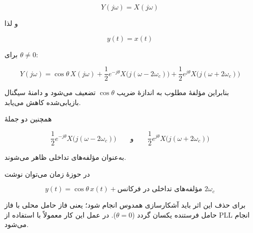 \[
Y(j\omega)=X(j\omega)
\]

و لذا

\[
{y(t)=x(t)}
\]


برای \(\theta\neq 0\):

\[
Y(j\omega)
=
\cos\theta\,X(j\omega)
+
\frac12 e^{-j\theta}
X\!\big(j(\omega-2\omega_c)\big)
+
\frac12 e^{j\theta}
X\!\big(j(\omega+2\omega_c)\big)
\]

بنابراین مؤلفهٔ مطلوب به اندازهٔ ضریب \(\cos\theta\) تضعیف می‌شود و دامنهٔ سیگنال بازیابی‌شده کاهش می‌یابد.

همچنین دو جملهٔ

\[
\frac12 e^{-j\theta}
X\!\big(j(\omega-2\omega_c)\big)
\qquad \text{و} \qquad
\frac12 e^{j\theta}
X\!\big(j(\omega+2\omega_c)\big)
\]

به‌عنوان مؤلفه‌های تداخلی ظاهر می‌شوند.

در حوزهٔ زمان می‌توان نوشت

\[
y(t)
=
\cos\theta\,x(t)
+
\text{مؤلفه‌های تداخلی در فرکانس } 2\omega_c
\]

برای حذف این اثر باید آشکارسازی همدوس انجام شود؛ یعنی فاز حامل محلی با فاز حامل فرستنده یکسان گردد (\(\theta=0\)). در عمل این کار معمولاً با استفاده از PLL انجام می‌شود.